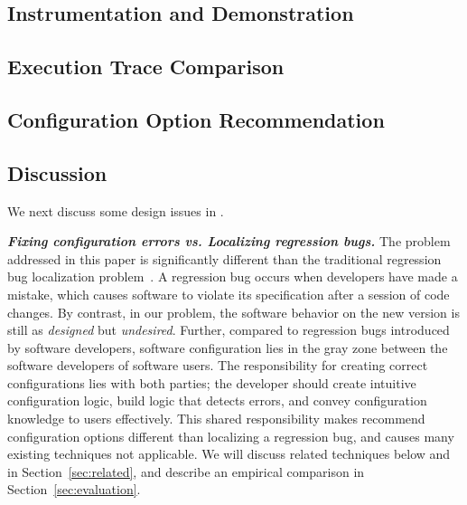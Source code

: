 \subsection{Instrumentation and Demonstration}
\label{sec:profiling}



\subsection{Execution Trace Comparison}
\label{sec:comparison}



\subsection{Configuration Option Recommendation}
\label{sec:rootcause}



\subsection{Discussion}
\label{sec:tech_discuss}

We next discuss some design issues in \ourtool.

\vspace{1mm}

\noindent \textbf{\textit{Fixing configuration errors 
vs. Localizing regression bugs.}}
The problem addressed in this paper is significantly different
than the traditional regression bug localization problem~\cite{dd, autoflow}.
A regression bug occurs when developers have made a mistake,
which causes software to violate its specification after a session of code changes.
By contrast, in our problem, the software behavior on the new version
is still as \textit{designed} but \textit{undesired}. 
Further, compared to
regression bugs introduced by software developers,
software configuration lies in the gray zone between
the software developers of software users. The responsibility for creating
correct configurations lies with both parties; the developer should create
intuitive configuration logic, build logic that detects
errors, and convey configuration knowledge to users
effectively. This shared responsibility makes recommend configuration options
different than localizing a regression bug, and causes many existing
techniques not applicable. We will discuss related techniques below
and in Section~\ref{sec:related}, and describe an empirical comparison
in Section~\ref{sec:evaluation}.


